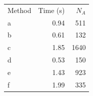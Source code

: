 \begin{tabular}{lrr}
\hline
Method & Time (s) & $N_A$ \\
a & 0.94 & 511 \\
b & 0.61 & 132 \\
c & 1.85 & 1640 \\
d & 0.53 & 150 \\
e & 1.43 & 923 \\
f & 1.99 & 335 \\
\hline
\end{tabular}
